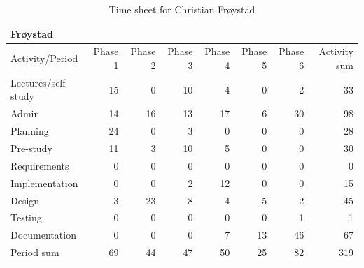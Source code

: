 \documentclass[11pt]{book}
\begin{document}
\begin{table}[H]
\centering
\begin{tabular}{| l | r | r | r | r | r | r | r |}
    \hline
    Frøystad            &          &          &          &          &             &             &              \\ \hline            
    Activity/Period     & Phase 1  & Phase 2  & Phase  3 & Phase 4  & Phase 5     & Phase 6     & Activity sum \\ \hline
    Lectures/self study & 15 & 0 & 10 & 4 & 0 & 2 & 33\\ \hline
    Admin & 14 & 16 & 13 & 17 & 6 & 30 & 98\\ \hline
    Planning & 24 & 0 & 3 & 0 & 0 & 0 & 28\\ \hline
    Pre-study & 11 & 3 & 10 & 5 & 0 & 0 & 30\\ \hline
    Requirements & 0 & 0 & 0 & 0 & 0 & 0 & 0\\ \hline
    Implementation & 0 & 0 & 2 & 12 & 0 & 0 & 15\\ \hline
    Design & 3 & 23 & 8 & 4 & 5 & 2 & 45\\ \hline
    Testing & 0 & 0 & 0 & 0 & 0 & 1 & 1\\ \hline
    Documentation & 0 & 0 & 0 & 7 & 13 & 46 & 67\\ \hline
    Period sum & 69 & 44 & 47 & 50 & 25 & 82 & 319\\ \hline
\end{tabular}
\caption{Time sheet for Christian Frøystad}
\label{tab:appendix_timesheets_christian}
\end{table}
\end{document}
